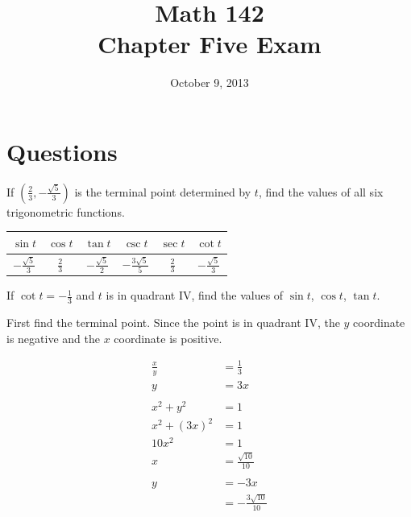 \documentclass[fleqn,addpoints]{exam}
\author{}
\date{October 9, 2013}
\title{Math 142 \\ Chapter Five Exam}
\begin{document}
  \maketitle


  \section{Questions}

  \begin{questions}
    
    \question[6]
      If $\left( \frac{2}{3}, - \frac{\sqrt{5}}{3} \right)$ is the terminal point determined by $t$, find the values of
      all six trigonometric functions. 
      
      \begin{solution}
        \begin{tabular}[H]{cccccc}
          \toprule
          $\sin t$               & $\cos t$      & $\tan t$               & $\csc t$                 & $\sec t$      & $\cot t$ \\
          \midrule
          $- \frac{\sqrt{5}}{3}$ & $\frac{2}{3}$ & $- \frac{\sqrt{5}}{2}$ & $- \frac{3 \sqrt{5}}{5}$ & $\frac{2}{3}$ & $- \frac{\sqrt{5}}{3}$ \\
          \bottomrule
        \end{tabular}
      \end{solution}

    \question[8]
      If $\cot t = - \frac{1}{3}$ and $t$ is in quadrant IV, find the values of $\sin t$, $\cos t$, $\tan t$.

      \begin{solution}
        First find the terminal point.  Since the point is in quadrant IV, the $y$ coordinate is negative and the $x$
        coordinate is positive.

        \begin{align*}
          \frac{x}{y}  & = \frac{1}{3} \\
          y            & = 3x \\
          \\
          x^2 + y^2    & = 1 \\
          x^2 + (3x)^2 & = 1 \\
          10 x^2       & = 1 \\
          x            & = \frac{\sqrt{10}}{10} \\
          \\
          y            & = -3x \\
                       & = -\frac{3 \sqrt{10}}{10}  \\
        \end{align*}


\end{solution}
\end{questions}
\end{document}
